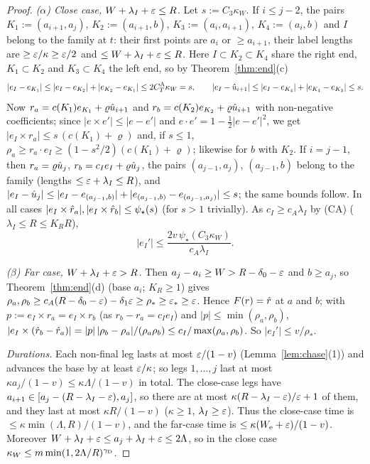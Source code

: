 \begin{proof}
\emph{($\alpha$) Close case, $W+\lambda_I+\varepsilon\le R$.} Let $s:=C_3\kappa_W$. If $i\le j-2$, the pairs $K_1:=(a_{i+1},a_j)$,
$K_2:=(a_{i+1},b)$, $K_3:=(a_i,a_{i+1})$, $K_4:=(a_i,b)$ and $I$ belong to the family at $t$: their first points are $a_i$ or
$\ge a_{i+1}$, their label lengths are $\ge\varepsilon/\kappa\ge\varepsilon/2$ and $\le W+\lambda_I+\varepsilon\le R$. Here $I\subset K_2\subset K_4$ share
the right end, $K_1\subset K_2$ and $K_3\subset K_4$ the left end, so by Theorem~\ref{thm:end}(c)
\[
|e_I-e_{K_1}|\le|e_I-e_{K_2}|+|e_{K_2}-e_{K_1}|\le2C_T^{\mathrm A}\kappa_W=s,\qquad
|e_I-\hat u_{i+1}|\le|e_I-e_{K_4}|+|e_{K_4}-e_{K_3}|\le s .
\]
Now $r_a=c(K_1)e_{K_1}+\varrho\hat u_{i+1}$ and $r_b=c(K_2)e_{K_2}+\varrho\hat u_{i+1}$ with non-negative coefficients; since
$|e\times e'|\le|e-e'|$ and $e\cdot e'=1-\frac12|e-e'|^2$, we get $|e_I\times r_a|\le s\,(c(K_1)+\varrho)$ and, if $s\le1$,
$\rho_a\ge r_a\cdot e_I\ge(1-s^2/2)(c(K_1)+\varrho)$; likewise for $b$ with $K_2$. If $i=j-1$, then $r_a=\varrho\hat u_j$,
$r_b=c_Ie_I+\varrho\hat u_j$, the pairs $(a_{j-1},a_j)$, $(a_{j-1},b)$ belong to the family (lengths $\le\varepsilon+\lambda_I\le R$), and
$|e_I-\hat u_j|\le|e_I-e_{(a_{j-1},b)}|+|e_{(a_{j-1},b)}-e_{(a_{j-1},a_j)}|\le s$; the same bounds follow. In all cases
$|e_I\times\hat r_a|,|e_I\times\hat r_b|\le\psi_\star(s)$ (for $s>1$ trivially). As $c_I\ge c_A\lambda_I$ by (CA) ($\lambda_I\le R\le K_RR$),
\[
|e_I'|\le\frac{2v\,\psi_\star(C_3\kappa_W)}{c_A\lambda_I}.
\]

\emph{($\beta$) Far case, $W+\lambda_I+\varepsilon>R$.} Then $a_j-a_i\ge W>R-\delta_0-\varepsilon$ and $b\ge a_j$, so Theorem~\ref{thm:end}(d) (base
$a_i$; $K_R\ge1$) gives $\rho_a,\rho_b\ge c_A(R-\delta_0-\varepsilon)-\delta_1\varepsilon\ge\rho_*\ge\varepsilon_*\ge\varepsilon$. Hence $F(r)=\hat r$ at $a$ and
$b$; with $p:=e_I\times r_a=e_I\times r_b$ (as $r_b-r_a=c_Ie_I$) and $|p|\le\min(\rho_a,\rho_b)$,
$|e_I\times(\hat r_b-\hat r_a)|=|p|\,|\rho_b-\rho_a|/(\rho_a\rho_b)\le c_I/\max(\rho_a,\rho_b)$. So $|e_I'|\le v/\rho_*$.

\emph{Durations.} Each non-final leg lasts at most $\varepsilon/(1-v)$ (Lemma~\ref{lem:chase}(1)) and advances the base by at least
$\varepsilon/\kappa$; so legs $1,\dots,j$ last at most $\kappa a_j/(1-v)\le\kappa\Lambda/(1-v)$ in total. The close-case legs have
$a_{i+1}\in[a_j-(R-\lambda_I-\varepsilon),a_j]$, so there are at most $\kappa(R-\lambda_I-\varepsilon)/\varepsilon+1$ of them, and they last at most
$\kappa R/(1-v)$ ($\kappa\ge1$, $\lambda_I\ge\varepsilon$). Thus the close-case time is $\le\kappa\min(\Lambda,R)/(1-v)$, and the far-case
time is $\le\kappa(W_{\mathrm e}+\varepsilon)/(1-v)$. Moreover $W+\lambda_I+\varepsilon\le a_j+\lambda_I+\varepsilon\le2\Lambda$, so in the close case
$\kappa_W\le m\min(1,2\Lambda/R)^{\gamma_{\mathrm D}}$.


\end{proof}
